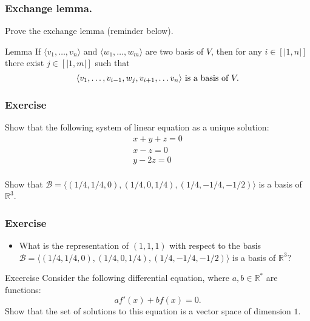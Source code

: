 \documentclass{beamer}
\begin{document}
\begin{frame}
  \frametitle{Exchange lemma.}
  Prove the exchange lemma (reminder below).
  
  \begin{block}{Lemma}
    If $\langle v_1, \dots, v_n \rangle$ and $\langle w_1, \dots, w_m \rangle$ are two basis of $V$, then for any $i \in [|1, n|]$ there exist $j \in [|1, m|]$ such that
    \[\langle v_{1}, \dots, v_{i-1}, w_j, v_{i+1}, \dots v_n \rangle \textnormal{ is a basis of } V.\]
  \end{block}
  
\end{frame}

\begin{frame}
  \frametitle{Exercise}
  Show that the following system of linear equation as a unique solution:
  \[
  \begin{array}{l}
    x + y + z = 0\\
    x - z = 0 \\
    y - 2z = 0\\
  \end{array}
  \]

  Show that $\mathcal{B} = \langle (1/4, 1/4, 0), (1/4,0,1/4), (1/4, -1/4, -1/2) \rangle$ is a basis of $\mathbb{R}^3$.
 
\end{frame}

\begin{frame}
  \frametitle{Exercise}
  \begin{itemize}
  \item What is the representation of $(1,1,1)$ with respect to the basis $\mathcal{B} = \langle (1/4, 1/4, 0), (1/4,0,1/4), (1/4, -1/4, -1/2) \rangle$ is a basis of $\mathbb{R}^3$?
  \end{itemize}
\end{frame}

\begin{frame}{Excercise}
  Consider the following differential equation, where $a, b \in \mathbb{R}^*$ are functions:
  \[ af'(x) + bf(x) = 0.\]
  Show that the set of solutions to this equation is a vector space of dimension $1$.
\end{frame}
\end{document}
